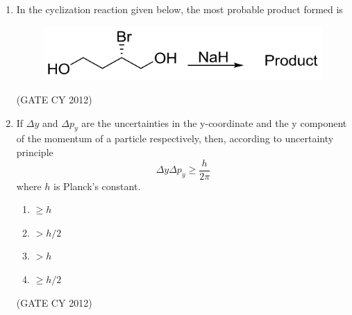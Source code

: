 \documentclass[12pt]{article}
\begin{document}
\begin{enumerate}
\item In the cyclization reaction given below, the most probable product formed is  
\begin{figure}[H]
    \centering
    \includegraphics[width=0.4\columnwidth]{figs/q3.png}
\end{figure}
\hfill (GATE CY 2012)

\item If $\Delta y$ and $\Delta p_y$ are the uncertainties in the y-coordinate and the y component of the momentum of a particle respectively, then, according to uncertainty principle  
\[
\Delta y \Delta p_y \geq \frac{h}{2\pi}
\]  
where $h$ is Planck’s constant.  
\begin{multicols}{2}
\begin{enumerate}
    \item $\geq h$ 
    \item $> h/2$ 
    \item $> h$ 
    \item $\geq h/2$
\end{enumerate}
\end{multicols}
\hfill (GATE CY 2012)


\end{enumerate}
\end{document}
